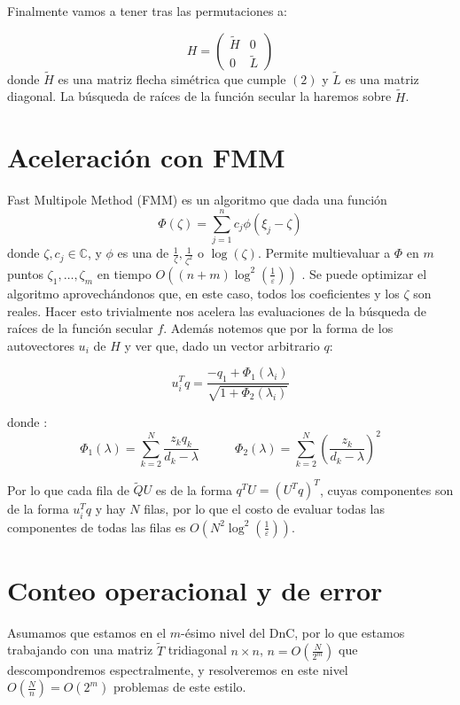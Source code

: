 \documentclass[11pt,a4paper]{article}
\newcommand{\Sum}{\sum\limits}
\begin{document}
Finalmente vamos a tener tras las permutaciones a:

$$H= \begin{pmatrix}
    \tilde{H} & 0\\
    0 & \tilde{L} 
\end{pmatrix}$$
donde $\tilde{H}$ es una matriz flecha simétrica que cumple $(2)$ y $\tilde{L}$ es una matriz diagonal.  La búsqueda de raíces de la función secular la haremos sobre $\tilde{H}$.\\

\section{Aceleración con FMM}

Fast Multipole Method (FMM) es un algoritmo que dada una función
\begin{equation}
\Phi(\zeta) = \Sum_{j=1}^n c_j \phi(\xi_j-\zeta)
\end{equation}
donde $\zeta,c_j\in \mathbb{C}$, y $\phi$ es una de $\frac{1}{\zeta}, \frac{1}{\zeta^2}$ o $\log(\zeta)$. Permite multievaluar a $\Phi$ en $m$ puntos $\zeta_1, \dots, \zeta_m$ en tiempo $O((n+m) \log^2(\frac{1}{\varepsilon}))$ \cite{gu1994}. Se puede optimizar el algoritmo aprovechándonos que, en este caso, todos los coeficientes y los $\zeta$ son reales. Hacer esto trivialmente nos acelera las evaluaciones de la búsqueda de raíces de la función secular $f$. Además notemos que por la forma de los autovectores $u_i$ de $H$ y ver que, dado un vector arbitrario $q$:

$$u_i^T q= \frac{-q_1+\Phi_1(\lambda_i)}{\sqrt{1+\Phi_2(\lambda_i)}}$$

donde :
$$\Phi_1(\lambda)= \Sum_{k=2}^N \frac{z_k q_k}{d_k-\lambda} ~~~~~~~~~~~~~ \Phi_2(\lambda)=\Sum_{k=2}^N \left(\frac{z_k}{d_k-\lambda}\right)^2$$

Por lo que cada fila de $\tilde{Q}U$ es de la forma $q^TU=\left(U^Tq\right)^T$, cuyas componentes son de la forma $u_i^Tq$ y hay $N$ filas, por lo que el costo de evaluar todas las componentes de todas las filas es $O(N^2\log^2(\frac1{\varepsilon}))$.

\section{Conteo operacional y de error}


Asumamos que estamos en el $m$-ésimo nivel del DnC, por lo que estamos trabajando con una matriz $\tilde T$ tridiagonal $n\times n$, $n = O\left(\frac N {2^m}\right)$ que descompondremos espectralmente, y resolveremos en este nivel $O(\frac{N} n)= O(2^m)$ problemas de este estilo.\\
\end{document}
